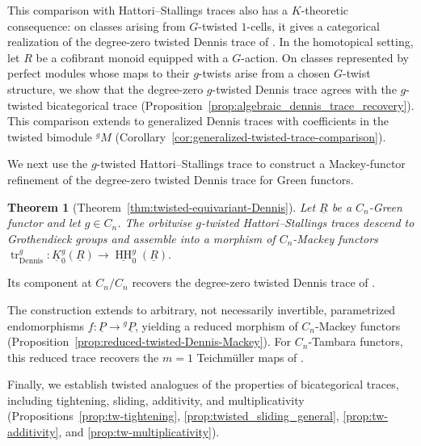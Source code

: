 \documentclass[11pt,oneside]{amsart}
\DeclareMathOperator{\HH}{HH}
\numberwithin{equation}{section}
\numberwithin{figure}{section}
\theoremstyle{plain}
\newtheorem{thm}{Theorem}[section]
\theoremstyle{definition}
\theoremstyle{remark}
\begin{document}
This comparison with Hattori--Stallings traces also has a
\(K\)-theoretic consequence: on classes
arising from \(G\)-twisted \(1\)-cells, it gives a categorical realization of
the degree-zero twisted Dennis trace of
\cite[Section~6.1]{AGHKK}. In the homotopical setting, let \(R\) be a
cofibrant monoid equipped with a \(G\)-action. On classes represented
by perfect modules whose maps to their \(g\)-twists arise from a
chosen \(G\)-twist structure, we show that the degree-zero
\(g\)-twisted Dennis trace agrees with the \(g\)-twisted
bicategorical trace
(Proposition~\ref{prop:algebraic_dennis_trace_recovery}). This
comparison extends to generalized Dennis traces with coefficients in
the twisted bimodule \({}^gM\)
(Corollary~\ref{cor:generalized-twisted-trace-comparison}).

We next use the \(g\)-twisted Hattori--Stallings trace to construct a
Mackey-functor refinement of the degree-zero twisted Dennis trace for
Green functors.

\begin{thm}[Theorem~\ref{thm:twisted-equivariant-Dennis}]
Let \(\underline R\) be a \(C_n\)-Green functor and let \(g\in C_n\).
The orbitwise \(g\)-twisted Hattori--Stallings traces descend to
Grothendieck groups and assemble into a morphism of \(C_n\)-Mackey
functors
\(\operatorname{tr}_{\mathrm{Dennis}}^g\colon
\underline K_0^g(\underline R)
\to
\underline{\HH}_0^g(\underline R).
\)
\end{thm}
Its component at \(C_n/C_n\) recovers the degree-zero twisted
Dennis trace of \cite[Section~6.1]{AGHKK}.

The construction extends to arbitrary, not necessarily invertible,
parametrized endomorphisms
\(f\colon\underline P\to{}^g\underline P\), yielding a reduced
morphism of \(C_n\)-Mackey functors
(Proposition~\ref{prop:reduced-twisted-Dennis-Mackey}).
For \(C_n\)-Tambara functors, this reduced trace recovers the \(m=1\)
Teichm\"uller maps of \cite[Theorem~6.13]{BGHL}.


Finally, we establish twisted analogues of the properties of bicategorical traces, including tightening, sliding, additivity, and multiplicativity (Propositions~\ref{prop:tw-tightening}, \ref{prop:twisted_sliding_general}, \ref{prop:tw-additivity}, and \ref{prop:tw-multiplicativity}).
\end{document}
